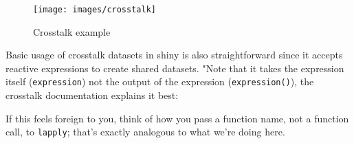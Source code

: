 \documentclass[10pt,]{krantz}
\makeatletter
\newenvironment{Shaded}{\begin{snugshade}}{\end{snugshade}}
\newcommand{\DataTypeTok}[1]{\textcolor[rgb]{0.27,0.27,0.27}{#1}}
\newcommand{\KeywordTok}[1]{\textcolor[rgb]{0.27,0.27,0.27}{\textbf{#1}}}
\newcommand{\NormalTok}[1]{#1}
\newcommand{\OperatorTok}[1]{\textcolor[rgb]{0.43,0.43,0.43}{\textbf{#1}}}
\newcommand{\StringTok}[1]{\textcolor[rgb]{0.5,0.5,0.5}{#1}}
\renewenvironment{quote}{\begin{VF}}{\end{VF}}
\newenvironment{kframe}{%
\medskip{}
\setlength{\fboxsep}{.8em}
 \def\at@end@of@kframe{}%
 \ifinner\ifhmode%
  \def\at@end@of@kframe{\end{minipage}}%
  \begin{minipage}{\columnwidth}%
 \fi\fi%
 \def\FrameCommand##1{\hskip\@totalleftmargin \hskip-\fboxsep
 \colorbox{shadecolor}{##1}\hskip-\fboxsep
     \hskip-\linewidth \hskip-\@totalleftmargin \hskip\columnwidth}%
 \MakeFramed {\advance\hsize-\width
   \@totalleftmargin\z@ \linewidth\hsize
   \@setminipage}}%
 {\par\unskip\endMakeFramed%
 \at@end@of@kframe}
\renewenvironment{Shaded}{\begin{kframe}}{\end{kframe}}
\makeatother
\begin{document}
\begin{Shaded}
\end{Shaded}

\begin{figure}[H]

{\centering \texttt{[image: images/crosstalk]} 

}

\caption{Crosstalk example}\label{fig:crosstalk-1}
\end{figure}

Basic usage of crosstalk datasets in shiny is also straightforward since it accepts reactive expressions to create shared datasets. "Note that it takes the expression itself (\texttt{expression}) not the output of the expression (\texttt{expression()}), the crosstalk documentation explains it best:

\begin{quote}
If this feels foreign to you, think of how you pass a function name, not a function call, to \texttt{lapply}; that's exactly analogous to what we're doing here.

\end{quote}
\end{document}
